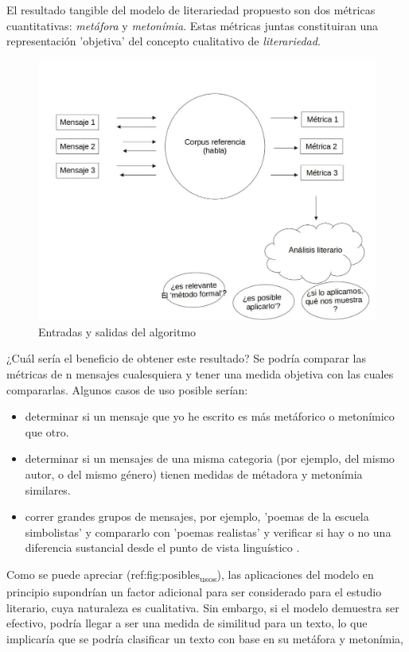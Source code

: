 \documentclass[twoside]{article}
\begin{document}
El resultado tangible del modelo de literariedad propuesto son dos
métricas cuantitativas: \emph{metáfora} y \emph{metonímia}.  Estas métricas
juntas constituiran una representación 'objetiva' del concepto
cualitativo de \emph{literariedad}.

\begin{figure}[htbp]
\centering
\includegraphics[width=.9\linewidth]{./assets/posibles_usos.jpg}
\caption{\label{fig:posibles_usos}Entradas y salidas del algoritmo}
\end{figure}


¿Cuál sería el beneficio de obtener este resultado? Se podría comparar
las métricas de n mensajes cualesquiera y tener una medida objetiva
con las  cuales compararlas. Algunos casos de uso posible serían:

\begin{itemize}
\item determinar si un mensaje que yo he escrito es más metáforico o metonímico que otro.

\item determinar si un mensajes de una misma categoria (por ejemplo, del mismo autor, o del mismo género)
tienen medidas de métadora y metonímia similares.

\item correr grandes grupos de mensajes, por ejemplo, 'poemas de la escuela simbolistas' y compararlo
con 'poemas realistas' y verificar si hay o no una diferencia sustancial desde el punto de
vista linguístico .
\end{itemize}

Como se puede apreciar (ref:fig:posibles\textsubscript{usos}), las aplicaciones del modelo en principio
supondrían un factor adicional para ser considerado para el
estudio literario, cuya naturaleza es cualitativa. Sin embargo, si
el modelo demuestra ser efectivo, podría llegar a ser una medida
de similitud para un texto, lo que implicaría que se podría
clasificar un texto con base en su metáfora y metonímia, 
\end{document}
